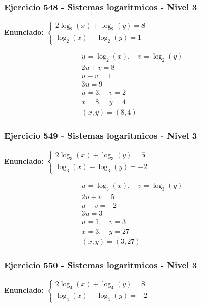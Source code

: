 \documentclass[12pt,a4paper]{article}
\begin{document}
\subsubsection*{Ejercicio 548 - Sistemas logaritmicos - Nivel 3}
\textbf{Enunciado:} \(\begin{cases} 2\log_{2}\left(x\right)+\log_{2}\left(y\right)=8\\ \log_{2}\left(x\right)-\log_{2}\left(y\right)=1\end{cases}\)

\[
\begin{aligned}
u=\log_{2}\left(x\right),\quad v=\log_{2}\left(y\right)\\
2u+v=8\\
u-v=1\\
3u=9\\
u=3,\quad v=2\\
x=8,\quad y=4\\
\boxed{(x,y)=(8,4)}
\end{aligned}
\]


\subsubsection*{Ejercicio 549 - Sistemas logaritmicos - Nivel 3}
\textbf{Enunciado:} \(\begin{cases} 2\log_{3}\left(x\right)+\log_{3}\left(y\right)=5\\ \log_{3}\left(x\right)-\log_{3}\left(y\right)=-2\end{cases}\)

\[
\begin{aligned}
u=\log_{3}\left(x\right),\quad v=\log_{3}\left(y\right)\\
2u+v=5\\
u-v=-2\\
3u=3\\
u=1,\quad v=3\\
x=3,\quad y=27\\
\boxed{(x,y)=(3,27)}
\end{aligned}
\]


\subsubsection*{Ejercicio 550 - Sistemas logaritmicos - Nivel 3}
\textbf{Enunciado:} \(\begin{cases} 2\log_{4}\left(x\right)+\log_{4}\left(y\right)=8\\ \log_{4}\left(x\right)-\log_{4}\left(y\right)=-2\end{cases}\)
\end{document}
